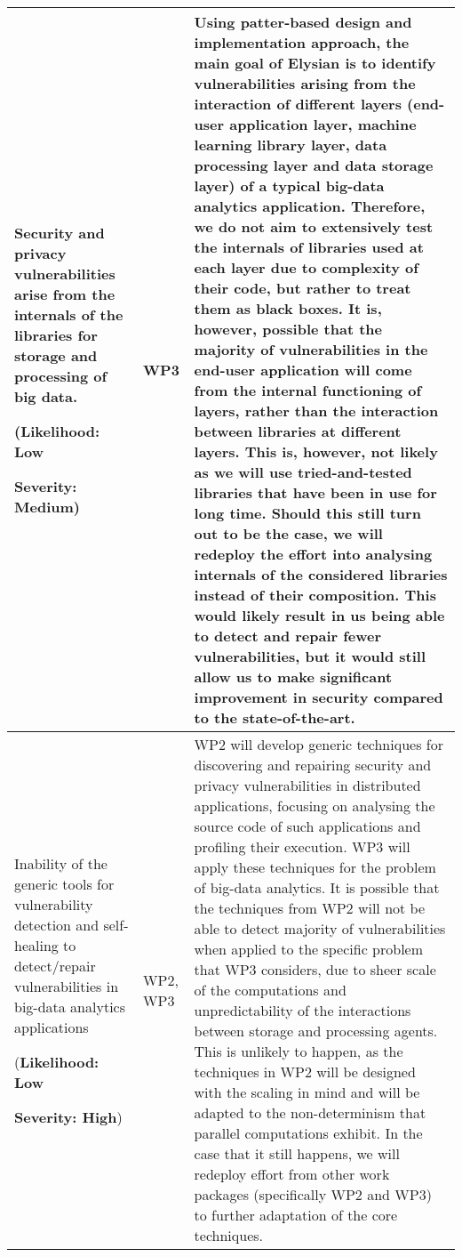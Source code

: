 \documentclass[a4paper,11pt]{article}
\newcommand{\project}[1]{\textbf{#1}\xspace}
\newcommand{\SECURITY}{\project{Elysian}}
\newcommand{\TheProject}{\SECURITY}
\begin{document}
\begin{longtable}{| p{3.5cm} | p{1.5cm} | p{11.8cm}  |}
\\\hline
Security and privacy vulnerabilities arise from the internals of the libraries for storage and processing of big data.
\par
({\textbf{Likelihood: Low}}
\par
{\textbf{Severity: Medium}})
& WP3 &
Using patter-based design and implementation approach, the main goal of \TheProject{} is to identify vulnerabilities arising from the interaction of different layers (end-user application layer, machine learning library layer, data processing layer and data storage layer) of a typical big-data analytics application. Therefore, we do not aim to extensively test the internals of libraries used at each layer due to complexity of their code, but rather to treat them as black boxes. It is, however, possible that the majority of vulnerabilities in the end-user application will come from the internal functioning of layers, rather than the interaction between libraries at different layers. This is, however, not likely as we will use tried-and-tested libraries that have been in use for long time. Should this still turn out to be the case, we will redeploy the effort into analysing internals of the considered libraries instead of their composition. This would likely result in us being able to detect and repair fewer vulnerabilities, but it would still allow us to make significant improvement in security compared to the state-of-the-art.
 
\\\hline
Inability of the generic tools for vulnerability detection and self-healing to detect/repair vulnerabilities in big-data analytics applications
\par
({\textbf{Likelihood: Low}}
\par
{\textbf{Severity: High}})
& WP2, WP3 &
WP2 will develop generic techniques for discovering and repairing security and privacy vulnerabilities in distributed applications, focusing on analysing the source code of such applications and profiling their execution. WP3 will apply these techniques for the problem of big-data analytics. It is possible that the techniques from WP2 will not be able to detect majority of vulnerabilities when applied to the specific problem that WP3 considers, due to sheer scale of the computations and unpredictability of the interactions between storage and processing agents. This is unlikely to happen, as the techniques in WP2 will be designed with the scaling in mind and will be adapted to the non-determinism that parallel computations exhibit. In the case that it still happens, we will redeploy effort from other work packages (specifically WP2 and WP3) to further adaptation of the core techniques. 
\\\hline
\end{longtable}
\end{document}
